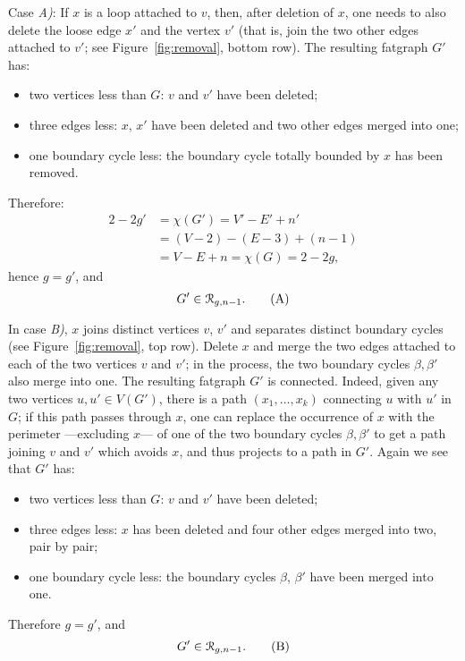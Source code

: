 Case {\slshape A)}: If $x$ is a loop attached to $v$, then, after deletion
of $x$, one needs to also delete the loose edge $x'$ and the
vertex $v'$ (that is, join the two other edges attached to $v'$; see
Figure~\ref{fig:removal}, bottom row).  The resulting fatgraph $G'$ has:
\begin{itemize}
\item two vertices less than $G$: $v$ and $v'$ have been deleted;
\item three edges less: $x$, $x'$ have been deleted and two other
  edges merged into one;
\item one boundary cycle less: the boundary cycle totally bounded by
  $x$ has been removed.
\end{itemize}
Therefore:
\begin{align*}
  2 - 2g' &= \chi(G') = V' - E' + n' 
  \\
  &= (V-2) -(E-3) + (n-1)
  \\
  &= V - E + n = \chi(G) = 2 - 2g,
\end{align*}
hence $g=g'$, and 
\begin{equation}
G' \in \mathcal{R}_{g,n-1}.
\label{eq:A}\tag{A}
\end{equation}

In case {\slshape B)}, $x$ joins distinct vertices $v$,
$v'$ and separates distinct boundary cycles (see Figure~\ref{fig:removal},
top row).  Delete $x$ and merge the two edges attached to each of
the two vertices $v$ and $v'$; in the process, the two boundary cycles
$\beta, \beta'$ also merge into one. The resulting fatgraph $G'$ is
connected. Indeed, given any two vertices $u, u' \in V(G')$, there is
a path $(x_1, \ldots, x_k)$ connecting $u$ with $u'$ in $G$; if this
path passes through $x$, one can replace the occurrence of $x$ with
the perimeter ---excluding $x$--- of one of the two boundary cycles
$\beta, \beta'$ to get a path joining $v$ and $v'$ which avoids $x$,
and thus projects to a path in $G'$.  Again we see that $G'$ has:
\begin{itemize}
\item two vertices less than $G$: $v$ and $v'$ have been deleted;
\item three edges less: $x$ has been deleted and four other
  edges merged into two, pair by pair;
\item one boundary cycle less: the boundary cycles $\beta$, $\beta'$
  have been merged into one.
\end{itemize}
Therefore $g=g'$, and 
\begin{equation}
G' \in \mathcal{R}_{g,n-1}.
\label{eq:B}\tag{B}
\end{equation}

